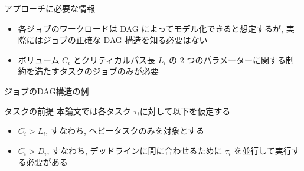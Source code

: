 \begin{frame}{アプローチに必要な情報}
    \begin{itemize}
        \item 各ジョブのワークロードは DAG によってモデル化できると想定するが, 実際にはジョブの正確な DAG 構造を知る必要はない
        \item ボリューム $C_{i}$ とクリティカルパス長 $L_{i}$ の 2 つのパラメーターに関する制約を満たすタスクのジョブのみが必要
    \end{itemize}
\end{frame}

\begin{frame}{ジョブのDAG構造の例}
\end{frame}

\begin{frame}{タスクの前提}
    本論文では各タスク $\tau_i$に対して以下を仮定する
    \begin{itemize}
        \item $C_{i}>L_{i}$, すなわち, ヘビータスクのみを対象とする
        \item $C_{i}>D_{i}$, すなわち, デッドラインに間に合わせるために $\tau_{i}$ を並行して実行する必要がある
    \end{itemize}
\end{frame}
